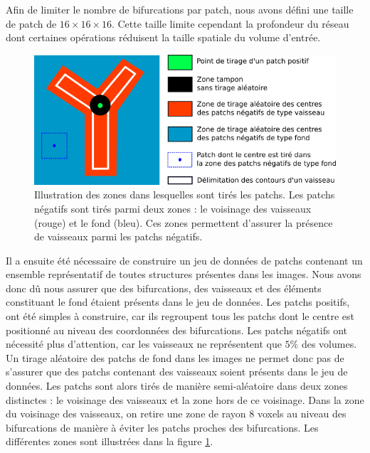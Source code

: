 Afin de limiter le nombre de bifurcations par patch, nous avons défini une taille de patch de $16 \times 16 \times 16$. Cette taille limite cependant la profondeur du réseau dont certaines opérations réduisent la taille spatiale du volume d'entrée.

\begin{figure}[!ht]
    \centering
    \includegraphics[width=\textwidth]{Images/drawing_patch_area.png}
    \caption{Illustration des zones dans lesquelles sont tirés les patchs. Les patchs négatifs sont tirés parmi deux zones : le voisinage des vaisseaux (rouge) et le fond (bleu). Ces zones permettent d'assurer la présence de vaisseaux parmi les patchs négatifs.}
    \label{fig:drawing_patch_area}
\end{figure}

Il a ensuite été nécessaire de construire un jeu de données de patchs contenant un ensemble représentatif de toutes structures présentes dans les images. Nous avons donc dû nous assurer que des bifurcations, des vaisseaux et des éléments constituant le fond étaient présents dans le jeu de données. Les patchs positifs, ont été simples à construire, car ils regroupent tous les patchs dont le centre est positionné au niveau des coordonnées des bifurcations. Les patchs négatifs ont nécessité plus d'attention, car les vaisseaux ne représentent que $5\percent{}$ des volumes. Un tirage aléatoire des patchs de fond dans les images ne permet donc pas de s'assurer que des patchs contenant des vaisseaux soient présents dans le jeu de données. Les patchs sont alors tirés de manière semi-aléatoire dans deux zones distinctes : le voisinage des vaisseaux et la zone hors de ce voisinage. Dans la zone du voisinage des vaisseaux, on retire une zone de rayon $8$ voxels au niveau des bifurcations de manière à éviter les patchs proches des bifurcations. Les différentes zones sont illustrées dans la figure \ref{fig:drawing_patch_area}.


